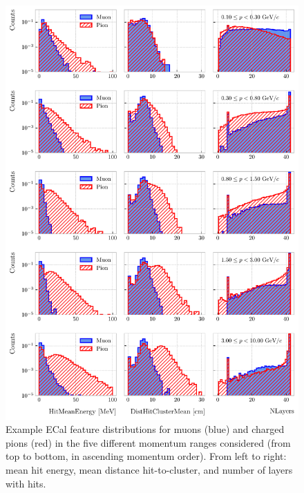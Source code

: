 \begin{figure}[p!]
	\centering
	\includegraphics[width=.95\linewidth]{Images/GArSoft_PID/BDT/ecal_feature_distribution_all_example.pdf}
	\caption[Example ECal feature distributions for muons and charged pions in the five different momentum ranges considered.]{Example ECal feature distributions for muons (blue) and charged pions (red) in the five different momentum ranges considered (from top to bottom, in ascending momentum order). From left to right: mean hit energy, mean distance hit-to-cluster, and number of layers with hits.}
	\label{fig:ecal_feature_example}
\end{figure}

